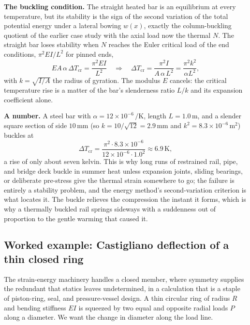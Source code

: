 \textbf{The buckling condition.} The straight heated bar is an equilibrium at
every temperature, but its stability is the sign of the second variation of the
total potential energy under a lateral bowing $w(x)$, exactly the column-buckling
quotient of the earlier case study with the axial load now the thermal $N$. The
straight bar loses stability when $N$ reaches the Euler critical load of the
end conditions, $\pi^2 EI/L^2$ for pinned ends,
\[
EA\,\alpha\,\Delta T_\text{cr} = \frac{\pi^2 EI}{L^2}
\quad\Longrightarrow\quad
\Delta T_\text{cr} = \frac{\pi^2 I}{A\,\alpha\,L^2}
= \frac{\pi^2 k^2}{\alpha L^2},
\]
with $k = \sqrt{I/A}$ the radius of gyration. The modulus $E$ cancels: the
critical temperature rise is a matter of the bar's slenderness ratio $L/k$ and
its expansion coefficient alone.

\textbf{A number.} A steel bar with $\alpha = 12\times 10^{-6}\,\si{\per
\kelvin}$, length $L = 1.0\,\si{\meter}$, and a slender square section of side
$10\,\si{\milli\meter}$ (so $k = 10/\sqrt{12} = 2.9\,\si{\milli\meter}$ and
$k^2 = 8.3\times 10^{-6}\,\si{\meter\squared}$) buckles at
\[
\Delta T_\text{cr} = \frac{\pi^2\cdot 8.3\times 10^{-6}}
                          {12\times 10^{-6}\cdot 1.0^2}
\approx 6.9\,\si{\kelvin},
\]
a rise of only about seven kelvin. This is why long runs of restrained
rail, pipe, and bridge deck buckle in summer heat unless expansion joints,
sliding bearings, or deliberate pre-stress give the thermal strain somewhere
to go; the failure is entirely a stability problem, and the energy method's
second-variation criterion is what locates it. The buckle relieves the
compression the instant it forms, which is why a thermally buckled rail springs
sideways with a suddenness out of proportion to the gentle warming that caused
it.

\subsection{Worked example: Castigliano deflection of a thin closed ring}

The strain-energy machinery handles a closed member, where symmetry supplies
the redundant that statics leaves undetermined, in a calculation that is a
staple of piston-ring, seal, and pressure-vessel design. A thin circular ring
of radius $R$ and bending stiffness $EI$ is squeezed by two equal and opposite
radial loads $P$ along a diameter. We want the change in diameter along the
load line.

